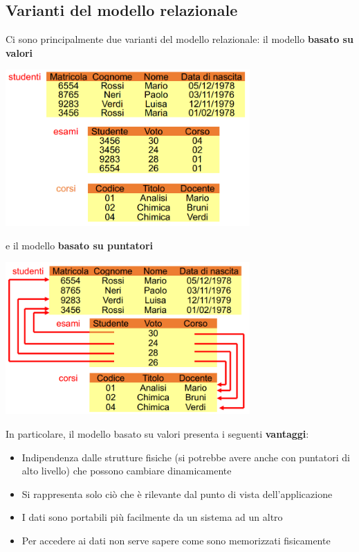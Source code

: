 \documentclass[12pt]{article}
\begin{document}
\subsection{Varianti del modello relazionale}
Ci sono principalmente due varianti del modello relazionale:
il modello \textbf{basato su valori}
\begin{center}
    \includegraphics[width = 0.70\textwidth]{Images/78.PNG}
\end{center}
e il modello \textbf{basato su puntatori}
\begin{center}
    \includegraphics[width = 0.70\textwidth]{Images/79.PNG}
\end{center}
In particolare, il modello basato su valori presenta i seguenti \textbf{vantaggi}:
\begin{itemize}
    \item Indipendenza dalle strutture fisiche (si potrebbe avere anche con puntatori di alto livello) che possono cambiare dinamicamente
    \item Si rappresenta solo ciò che è rilevante dal punto di vista dell'applicazione
    \item I dati sono portabili più facilmente da un sistema ad un altro
    \item Per accedere ai dati non serve sapere come sono memorizzati fisicamente
\end{itemize}
\end{document}
